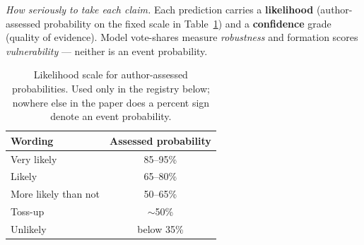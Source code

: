 \documentclass[11pt,a4paper]{article}
\begin{document}
\emph{How seriously to take each claim.} Each prediction carries a
\textbf{likelihood} (author-assessed probability on the fixed scale in
Table~\ref{tab:likelihood-scale}) and a \textbf{confidence} grade (quality
of evidence). Model vote-shares measure \emph{robustness} and formation
scores \emph{vulnerability} --- neither is an event probability.

\begin{table}[htbp]
\centering
\caption{Likelihood scale for author-assessed probabilities. Used only in the registry below; nowhere else in the paper does a percent sign denote an event probability.}
\label{tab:likelihood-scale}
\begin{tabular}{lc}
\toprule
Wording & Assessed probability \\
\midrule
Very likely & 85--95\% \\
Likely & 65--80\% \\
More likely than not & 50--65\% \\
Toss-up & $\sim$50\% \\
Unlikely & below 35\% \\
\bottomrule
\end{tabular}
\end{table}
\end{document}

